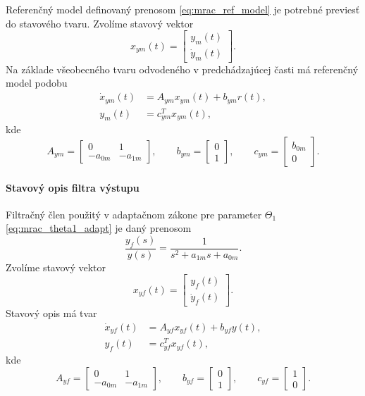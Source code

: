 Referenčný model definovaný prenosom
\eqref{eq:mrac_ref_model}
je potrebné previesť do stavového tvaru.
Zvolíme stavový vektor
\begin{equation}
	x_{ym}(t)
	=
	\begin{bmatrix}
		y_m(t) \\
		\dot{y}_m(t)
	\end{bmatrix}.
\end{equation}
Na základe všeobecného tvaru odvodeného v predchádzajúcej časti
má referenčný model podobu
\begin{align}
	\dot{x}_{ym}(t)
	&=
	A_{ym} x_{ym}(t)
	+
	b_{ym} r(t),
	\\
	y_m(t)
	&=
	c_{ym}^{T} x_{ym}(t),
\end{align}
kde
\begin{equation}
	A_{ym}
	=
	\begin{bmatrix}
		0 & 1 \\
		- a_{0m} & - a_{1m}
	\end{bmatrix},
	\qquad
	b_{ym}
	=
	\begin{bmatrix}
		0 \\
		1
	\end{bmatrix},
	\qquad
	c_{ym}
	=
	\begin{bmatrix}
		b_{0m} \\
		0
	\end{bmatrix}.
\end{equation}


\paragraph{Stavový opis filtra výstupu}

Filtračný člen použitý v adaptačnom zákone
pre parameter $\Theta_1$
\eqref{eq:mrac_theta1_adapt}
je daný prenosom
\begin{equation}
	\frac{y_f(s)}{y(s)}
	=
	\frac{1}{s^2 + a_{1m}s + a_{0m}}.
\end{equation}
Zvolíme stavový vektor
\begin{equation}
	x_{yf}(t)
	=
	\begin{bmatrix}
		y_f(t) \\
		\dot{y}_f(t)
	\end{bmatrix}.
\end{equation}
Stavový opis má tvar
\begin{align}
	\dot{x}_{yf}(t)
	&=
	A_{yf} x_{yf}(t)
	+
	b_{yf} y(t),
	\\
	y_f(t)
	&=
	c_{yf}^{T} x_{yf}(t),
\end{align}
kde
\begin{equation}
	A_{yf}
	=
	\begin{bmatrix}
		0 & 1 \\
		- a_{0m} & - a_{1m}
	\end{bmatrix},
	\qquad
	b_{yf}
	=
	\begin{bmatrix}
		0 \\
		1
	\end{bmatrix},
	\qquad
	c_{yf}
	=
	\begin{bmatrix}
		1 \\
		0
	\end{bmatrix}.
\end{equation}


